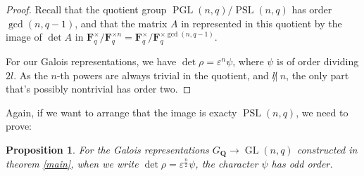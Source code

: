 \documentclass{article}
\newtheorem{proposition}[theorem]{Proposition}
\theoremstyle{definition}
\DeclareMathOperator{\GL}{\mathrm{GL}}
\DeclareMathOperator{\PGL}{\mathrm{PGL}}
\DeclareMathOperator{\PSL}{\mathrm{PSL}}
\begin{document}
	\begin{proof}
		Recall that the quotient group $\PGL(n,q)/\PSL(n,q)$ has order $\gcd(n,q-1)$, and that the matrix $A$ in represented in this quotient by the image of $\det A$ in $\mathbf{F}_q^{\times}/ \mathbf{F}_q^{\times n} = \mathbf{F}_q^{\times}/ \mathbf{F}_q^{\times \gcd(n,q-1)}$. \par 
		For our Galois representations, we have $\det \rho = \varepsilon^n \psi$, where $\psi$ is of order dividing $2l$. As the $n$-th powers are always trivial in the quotient, and $l {\not |}\ n$, the only part that's possibly nontrivial has order two.
	\end{proof}
	Again, if we want to arrange that the image is exacty $\PSL(n,q)$, we need to prove:
	\begin{proposition} \label{odd'}
		For the Galois representations $G_{\mathbf{Q}} \to \GL(n,q)$ constructed in theorem \ref{main}, when we write $\det \rho = \varepsilon^{\frac{n}{2}} \psi$, the character $\psi$ has odd order.
	\end{proposition}
\end{document}
